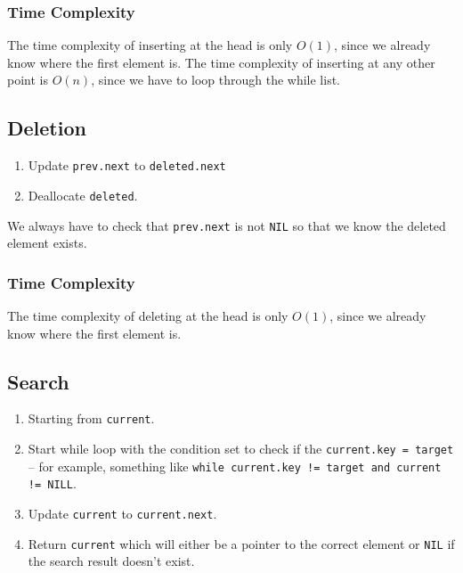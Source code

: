 \subsubsection{Time Complexity}\label{ssub:linkedlistinsertcomplexity}

The time complexity of inserting at the head is only \(O(1)\), since we already know where the first element is.
The time complexity of inserting at any other point is \(O(n)\), since we have to loop through the while list.

\subsection{Deletion}\label{sub:linkedlistdeletion}

\begin{enumerate}
    \item Update \texttt{prev.next} to \texttt{deleted.next}
    \item Deallocate \texttt{deleted}.
\end{enumerate}
\begin{note}
    We always have to check that \texttt{prev.next} is not \texttt{NIL} so that we know the deleted element exists.
\end{note}

\subsubsection{Time Complexity}\label{ssub:linkedlistdeletecomplexity}

The time complexity of deleting at the head is only \(O(1)\), since we already know where the first element is.

\subsection{Search}\label{sub:linkedlistsearch}

\begin{enumerate}
    \item Starting from \texttt{current}.
    \item Start while loop with the condition set to check if the \texttt{current.key = target} -- for example, something like \texttt{while current.key != target and current != NILL}.
    \item Update \texttt{current} to \texttt{current.next}.
    \item Return \texttt{current} which will either be a pointer to the correct element or \texttt{NIL} if the search result doesn't exist.
\end{enumerate}

